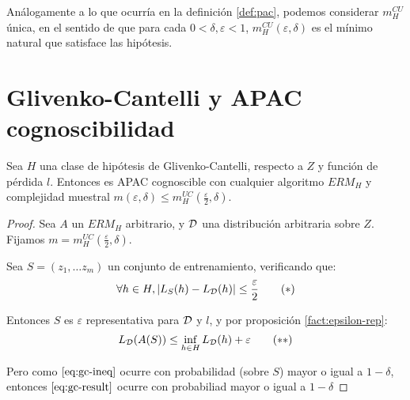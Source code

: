 Análogamente a lo que ocurría en la definición \ref{def:pac}, podemos considerar $m_H^{CU}$ única, en el sentido de
que para cada $0 < \delta, \varepsilon < 1$, $m_{H}^{CU}(\varepsilon, \delta)$ es el mínimo natural que satisface las 
hipótesis.

\section{Glivenko-Cantelli y APAC cognoscibilidad}

\begin{theorem}
Sea $H$ una clase de hipótesis de Glivenko-Cantelli, respecto a $Z$ y función de pérdida $l$. 
Entonces es APAC cognoscible con cualquier algoritmo $ERM_H$ y complejidad muestral
$m(\varepsilon, \delta) \le m_{H}^{UC} \left(\frac{\varepsilon}{2}, \delta \right)$. 
\label{th:gc-apac}
\end{theorem}

  \begin{proof}
   Sea $A$ un $ERM_H$ arbitrario, y $\mathcal{D}$ una distribución arbitraria sobre $Z$.
   Fijamos $m = m_{H}^{UC} \left(\frac{\varepsilon}{2}, \delta \right)$.

   Sea $S = (z_1, \ldots z_m)$ un conjunto de entrenamiento, verificando que: 
   \begin{equation}
     \forall h\in H, |L_{S}(h)-L_{\mathcal{D}}(h)| \le \frac{\varepsilon}{2}
     \label{eq:gc-ineq}\tag{$\ast$}
   \end{equation}

   Entonces $S$ es $\varepsilon$ representativa para $\mathcal{D}$ y $l$, y por proposición \ref{fact:epsilon-rep}:
   \begin{equation}
    L_{\mathcal{D}}(A(S)) \le \inf_{h\in H} L_{\mathcal{D}}(h) + \varepsilon
    \label{eq:gc-result}\tag{$\ast\ast$}
   \end{equation}

   Pero como $\eqref{eq:gc-ineq}$ ocurre con probabilidad (sobre $S$) mayor o igual a $1-\delta$, entonces 
   $\eqref{eq:gc-result}$ ocurre con probabiliad mayor o igual a $1-\delta$
  \end{proof}
  

